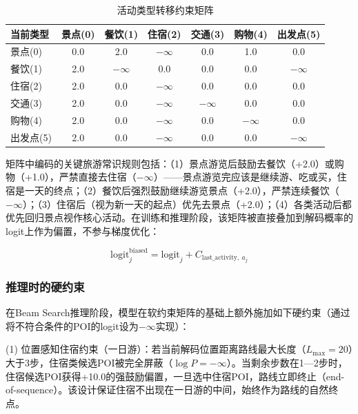 \documentclass[12pt,a4paper]{ctexart}
\newenvironment{tighttable}
  {\setstretch{1.0}\small}
  {}
\begin{document}
\begin{table}[H]
\centering
\caption{活动类型转移约束矩阵}
\label{tab:transition}
\begin{tighttable}
\begin{tabular}{lcccccc}
\toprule
当前类型 & 景点(0) & 餐饮(1) & 住宿(2) & 交通(3) & 购物(4) & 出发点(5) \\
\midrule
景点(0) & 0.0 & 2.0 & $-\infty$ & 0.0 & 1.0 & 0.0 \\
餐饮(1) & 2.0 & $-\infty$ & 0.0 & 0.0 & 0.0 & $-\infty$ \\
住宿(2) & 2.0 & 0.0 & $-\infty$ & 0.0 & 0.0 & 0.0 \\
交通(3) & 2.0 & 0.0 & $-\infty$ & $-\infty$ & 0.0 & 0.0 \\
购物(4) & 2.0 & 0.0 & $-\infty$ & 0.0 & $-\infty$ & 0.0 \\
出发点(5) & 2.0 & 0.0 & $-\infty$ & 0.0 & 0.0 & $-\infty$ \\
\bottomrule
\end{tabular}
\end{tighttable}
\end{table}

矩阵中编码的关键旅游常识规则包括：（1）景点游览后鼓励去餐饮（+2.0）或购物（+1.0），严禁直接去住宿（$-\infty$）——景点游览完应该是继续游、吃或买，住宿是一天的终点；（2）餐饮后强烈鼓励继续游览景点（+2.0），严禁连续餐饮（$-\infty$）；（3）住宿后（视为新一天的起点）优先去景点（+2.0）；（4）各类活动后都优先回归景点视作核心活动。在训练和推理阶段，该矩阵被直接叠加到解码概率的logit上作为偏置，不参与梯度优化：

\begin{equation}
\text{logit}^{\text{biased}}_j = \text{logit}_j + C_{\text{last\_activity},\ a_j}
\label{eq:biased_logit}
\end{equation}

\subsubsection{推理时的硬约束}

在Beam Search推理阶段，模型在软约束矩阵的基础上额外施加如下硬约束（通过将不符合条件的POI的logit设为$-\infty$实现）：

(1) 位置感知住宿约束（一日游）：若当前解码位置距离路线最大长度（$L_{\max}=20$）大于3步，住宿类候选POI被完全屏蔽（$\log P=-\infty$）。当剩余步数在1—2步时，住宿候选POI获得+10.0的强鼓励偏置，一旦选中住宿POI，路线立即终止（end-of-sequence）。该设计保证住宿不出现在一日游的中间，始终作为路线的自然终点。
\end{document}
